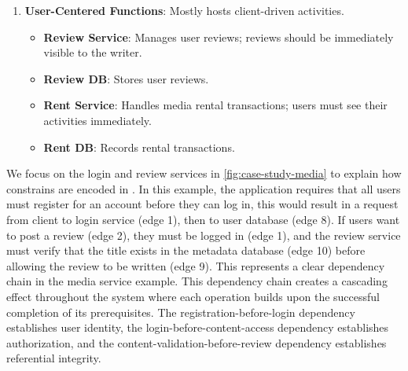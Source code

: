 \begin{enumerate}[leftmargin=*,noitemsep,topsep=2pt]
  \item \textbf{User-Centered Functions}: Mostly hosts client-driven activities. 
    \begin{itemize}[leftmargin=*, noitemsep,topsep=0pt]
      \item \textbf{Review Service}: Manages user reviews; reviews should be immediately visible to the writer.
      \item \textbf{Review DB}: Stores user reviews.
      \item \textbf{Rent Service}: Handles media rental transactions;
        users must see their activities immediately.
      \item \textbf{Rent DB}: Records rental transactions.
    \end{itemize}
\end{enumerate}

We focus on the login and review services in \cref{fig:case-study-media}
to explain how constrains are encoded in \sysname{}.
In this example, the application requires that all users must register for
an account before they can log in, this would result in a request from
client to login service (edge 1), then to user database (edge 8).
If users want to post a review (edge 2), they must
be logged in (edge 1), and the review service must verify that the
title exists
in the metadata database (edge 10) before allowing the review to be
written (edge 9).
This represents a clear dependency chain in the media service example.
This dependency chain creates a cascading effect throughout the system
where each operation builds upon the successful completion of its
prerequisites.
The registration-before-login dependency establishes user identity,
the login-before-content-access dependency establishes authorization,
and the content-validation-before-review dependency establishes
referential integrity.


